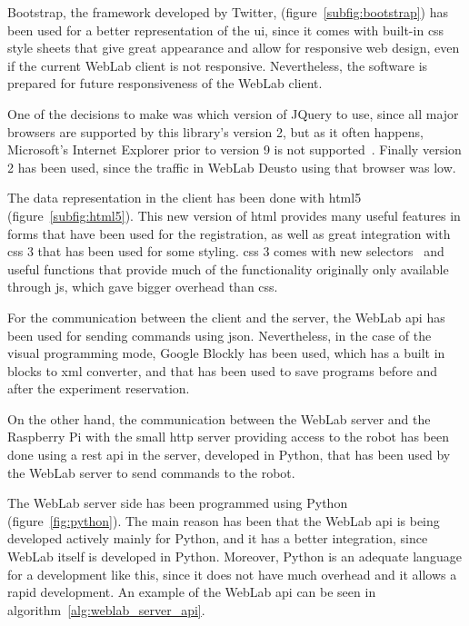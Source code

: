 Bootstrap, the framework developed by Twitter, (figure~\ref{subfig:bootstrap}) has been used for a
better representation of the \acrlong{ui}, since it comes with built-in \acrshort{css} style
sheets that give great appearance and allow for responsive web design, even if the current WebLab
client is not responsive. Nevertheless, the software is prepared for future responsiveness of the
WebLab client.

One of the decisions to make was which version of JQuery to use, since all major browsers are
supported by this library's version 2, but as it often happens, Microsoft's Internet Explorer prior
to version 9 is not supported~\cite{jquery_versions}. Finally version 2 has been used, since the
traffic in WebLab Deusto using that browser was low.

The data representation in the client has been done with \acrshort{html}5~\cite{html5_spec}
(figure~\ref{subfig:html5}). This new version of \acrshort{html} provides many useful features in
forms that have been used for the registration, as well as great integration with \acrshort{css} 3
that has been used for some styling. \acrshort{css} 3 comes with new selectors~\cite{css3_sel} and
useful functions that provide much of the functionality originally only available through
\acrlong{js}, which gave bigger overhead than \acrshort{css}.

For the communication between the client and the server, the WebLab \acrshort{api} has been used for
sending commands using \acrshort{json}. Nevertheless, in the case of the visual programming mode,
Google Blockly has been used, which has a built in blocks to \acrshort{xml} converter, and that has
been used to save programs before and after the experiment reservation.

On the other hand, the communication between the WebLab server and the Raspberry Pi with the small
\acrshort{http} server providing access to the robot has been done using a \acrshort{rest}
\acrshort{api} in the server, developed in Python, that has been used by the WebLab server to send
commands to the robot.

The WebLab server side has been programmed using Python (figure~\ref{fig:python}). The main reason
has been that the WebLab \acrshort{api} is being developed actively mainly for Python, and it has
a better integration, since WebLab itself is developed in Python. Moreover, Python is an adequate
language for a development like this, since it does not have much overhead and it allows a rapid
development. An example of the WebLab \acrshort{api} can be seen in
algorithm~\ref{alg:weblab_server_api}.


